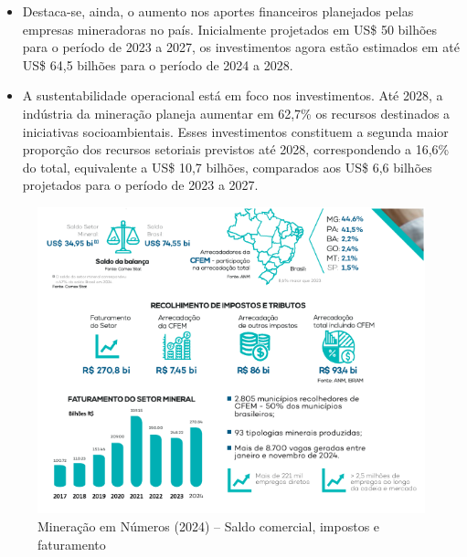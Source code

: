 \begin{itemize}
\item Destaca-se, ainda, o aumento nos aportes financeiros planejados pelas empresas mineradoras no país. Inicialmente projetados em US\$ 50 bilhões para o período de 2023 a 2027, os investimentos agora estão estimados em até US\$ 64,5 bilhões para o período de 2024 a 2028.

\item A sustentabilidade operacional está em foco nos investimentos. Até 2028, a indústria da mineração planeja aumentar em 62,7\% os recursos destinados a iniciativas socioambientais. Esses investimentos constituem a segunda maior proporção dos recursos setoriais previstos até 2028, correspondendo a 16,6\% do total, equivalente a US\$ 10,7 bilhões, comparados aos US\$ 6,6 bilhões projetados para o período de 2023 a 2027.
\end{itemize}

\begin{figure}[!htb]
    \centering
    \includegraphics[width=\textwidth]{figures/image1_mineracao_numeros_1.png}
    \caption{Mineração em Números (2024) -- Saldo comercial, impostos e faturamento}
    \label{fig:image1_mineracao_numeros_1}
\end{figure}

